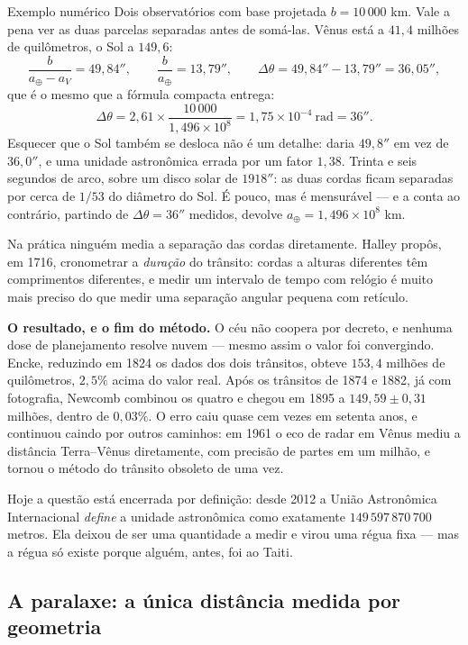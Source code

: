 \documentclass[11pt,a4paper]{article}
\begin{document}
\begin{lessonblock}{Exemplo numérico}
Dois observatórios com base projetada $b=10\,000$ km. Vale a pena ver as duas parcelas separadas antes de somá-las. Vênus está a $41{,}4$ milhões de quilômetros, o Sol a $149{,}6$:
\[
\frac{b}{a_\oplus-a_V}=49{,}84'' ,
\qquad
\frac{b}{a_\oplus}=13{,}79'' ,
\qquad
\Delta\theta=49{,}84''-13{,}79''=36{,}05'' ,
\]
que é o mesmo que a fórmula compacta entrega:
\[
\Delta\theta=2{,}61\times\frac{10\,000}{1{,}496\times10^{8}}=1{,}75\times10^{-4}\ \mathrm{rad}=36'' .
\]
Esquecer que o Sol também se desloca não é um detalhe: daria $49{,}8''$ em vez de $36{,}0''$, e uma unidade astronômica errada por um fator $1{,}38$.
Trinta e seis segundos de arco, sobre um disco solar de $1918''$: as duas cordas ficam separadas por cerca de $1/53$ do diâmetro do Sol. É pouco, mas é mensurável --- e a conta ao contrário, partindo de $\Delta\theta=36''$ medidos, devolve $a_\oplus=1{,}496\times10^{8}$ km.

Na prática ninguém media a separação das cordas diretamente. Halley propôs, em 1716, cronometrar a \emph{duração} do trânsito: cordas a alturas diferentes têm comprimentos diferentes, e medir um intervalo de tempo com relógio é muito mais preciso do que medir uma separação angular pequena com retículo.
\end{lessonblock}

\textbf{O resultado, e o fim do método.} O céu não coopera por decreto, e nenhuma dose de planejamento resolve nuvem --- mesmo assim o valor foi convergindo. Encke, reduzindo em 1824 os dados dos dois trânsitos, obteve $153{,}4$ milhões de quilômetros, $2{,}5\%$ acima do valor real. Após os trânsitos de 1874 e 1882, já com fotografia, Newcomb combinou os quatro e chegou em 1895 a $149{,}59\pm0{,}31$ milhões, dentro de $0{,}03\%$. O erro caiu quase cem vezes em setenta anos, e continuou caindo por outros caminhos: em 1961 o eco de radar em Vênus mediu a distância Terra--Vênus diretamente, com precisão de partes em um milhão, e tornou o método do trânsito obsoleto de uma vez.

Hoje a questão está encerrada por definição: desde 2012 a União Astronômica Internacional \emph{define} a unidade astronômica como exatamente $149\,597\,870\,700$ metros. Ela deixou de ser uma quantidade a medir e virou uma régua fixa --- mas a régua só existe porque alguém, antes, foi ao Taiti.

\subsection*{A paralaxe: a única distância medida por geometria}
\end{document}
